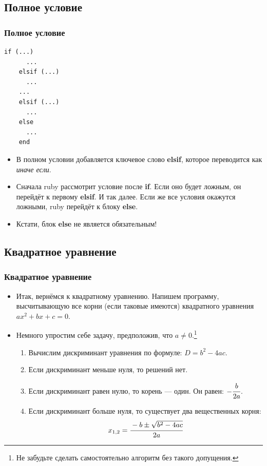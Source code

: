 \documentclass[compress,red]{beamer}
\begin{document}
\subsection{Полное условие}
\begin{frame}[fragile]
  \frametitle{Полное условие}
  \scriptsize{
  \begin{lstlisting}[label=ruby8,caption=Схема полного условия]
    if (...)
      ...
    elsif (...)
      ...
    ...
    elsif (...)
      ...
    else
      ...
    end
  \end{lstlisting}}
  \begin{itemize}
    \item В полном условии добавляется ключевое слово \textbf{elsif}, которое переводится как \emph{иначе если}.
    \item Сначала ruby рассмотрит условие после \textbf{if}. Если оно будет ложным, он перейдёт к первому \textbf{elsif}. И так далее. Если же все условия окажутся ложными, ruby перейдёт к блоку \textbf{else}.
    \item Кстати, блок \textbf{else} не является обязательным!
  \end{itemize}

\end{frame}

\subsection{Квадратное уравнение}
\begin{frame}
  \frametitle{Квадратное уравнение}
  \begin{itemize}
    \item Итак, вернёмся к квадратному уравнению. Напишем программу, высчитывающую все корни (если таковые имеются) квадратного уравнения $ax^2+bx+c=0$.
    \item Немного упростим себе задачу, предположив, что $a \neq 0$.\footnote{Не забудьте сделать самостоятельно алгоритм без такого допущения.}
    \begin{enumerate}
      \item Вычислим дискриминант уравнения по формуле: $D = b^2 - 4ac$.
      \item Если дискриминант меньше нуля, то решений нет.
      \item Если дискриминант равен нулю, то корень --- один. Он равен: $-\cfrac{b}{2a}$.
      \item Если дискриминант больше нуля, то существует два вещественных корня:
        \begin{gather*}
          x_{1,2} = \cfrac{-b \pm \sqrt{b^2-4ac}}{2a}
        \end{gather*}
    \end{enumerate}
  \end{itemize}
  
\end{frame}
\end{document}
